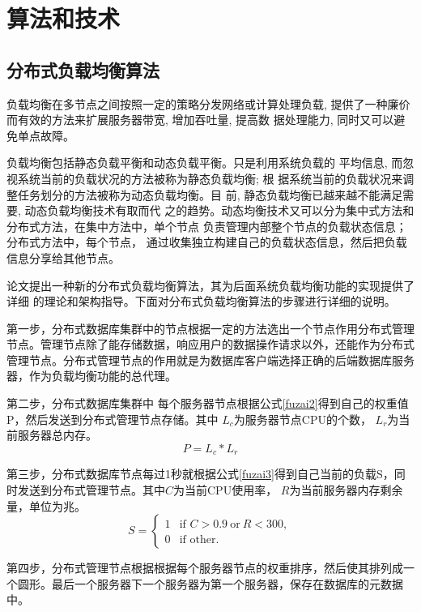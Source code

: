 \section{算法和技术}
\subsection{分布式负载均衡算法}
负载均衡在多节点之间按照一定的策略分发网络或计算处理负载,
提供了一种廉价而有效的方法来扩展服务器带宽, 增加吞吐量, 提高数
据处理能力, 同时又可以避免单点故障。

负载均衡包括静态负载平衡和动态负载平衡。只是利用系统负载的
平均信息, 而忽视系统当前的负载状况的方法被称为静态负载均衡; 根
据系统当前的负载状况来调整任务划分的方法被称为动态负载均衡。目
前, 静态负载均衡已越来越不能满足需要, 动态负载均衡技术有取而代
之的趋势。动态均衡技术又可以分为集中式方法和分布式方法，在集中方法中，单个节点
负责管理内部整个节点的负载状态信息；
分布式方法中，每个节点，
通过收集独立构建自己的负载状态信息，然后把负载信息分享给其他节点。

论文提出一种新的分布式负载均衡算法，其为后面系统负载均衡功能的实现提供了详细
的理论和架构指导。下面对分布式负载均衡算法的步骤进行详细的说明。

第一步，分布式数据库集群中的节点根据一定的方法选出一个节点作用分布式管理节点。管理节点除了能存储数据，响应用户的数据操作请求以外，还能作为分布式管理节点。分布式管理节点的作用就是为数据库客户端选择正确的后端数据库服务器，作为负载均衡功能的总代理。

第二步，分布式数据库集群中
每个服务器节点根据公式\ref{fuzai2}得到自己的权重值P，然后发送到分布式管理节点存储。其中
$ L_c $为服务器节点CPU的个数， $ L_r $为当前服务器总内存。
\begin{equation}
P=L_c * L_r \label{fuzai2}
\end{equation}

第三步，分布式数据库节点每过1秒就根据公式\ref{fuzai3}得到自己当前的负载S，同时发送到分布式管理节点。其中$ C $为当前CPU使用率， $ R $为当前服务器内存剩余量，单位为兆。
\begin{equation}
S =
\begin{cases}
1 & \text{if } C >0.9 \: \text{or} \: R<300,\\
0 & \text{if } \text{other}.
\end{cases}   \label{fuzai3}
\end{equation}

第四步，分布式管理节点根据根据每个服务器节点的权重排序，然后使其排列成一个圆形。最后一个服务器下一个服务器为第一个服务器，保存在数据库的元数据中。

